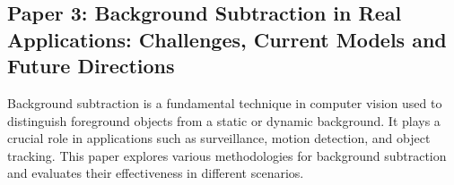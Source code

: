\documentclass[11pt]{report}
\begin{document}

\subsection{Paper 3: Background Subtraction in Real Applications: Challenges, Current Models and Future Directions}

Background subtraction is a fundamental technique in computer vision used to distinguish foreground objects from a static or dynamic background. It plays a crucial role in applications such as surveillance, motion detection, and object tracking. This paper explores various methodologies for background subtraction and evaluates their effectiveness in different scenarios.
\end{document}

